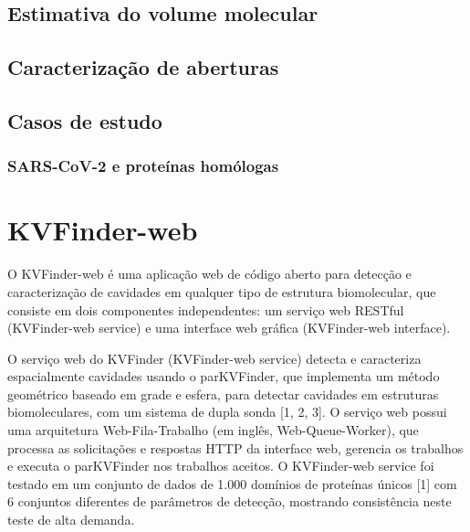 \documentclass[Portugues]{phdquali}
\begin{document}
\subsection{Estimativa do volume molecular}

\cite{guerra2023B}

\subsection{Caracterização de aberturas}

\cite{guerra2023A}

\subsection{Casos de estudo}

\subsubsection{SARS-CoV-2 e proteínas homólogas}

\section{KVFinder-web}


O KVFinder-web é uma aplicação web de código aberto para detecção e caracterização de cavidades em qualquer tipo de estrutura biomolecular, que consiste em dois componentes independentes: um serviço web RESTful (KVFinder-web service) e uma interface web gráfica (KVFinder-web interface).  

O serviço web do KVFinder (KVFinder-web service) detecta e caracteriza espacialmente cavidades usando o parKVFinder, que implementa um método geométrico baseado em grade e esfera, para detectar cavidades em estruturas biomoleculares, com um sistema de dupla sonda [1, 2, 3]. O serviço web possui uma arquitetura Web-Fila-Trabalho (em inglês, Web-Queue-Worker), que processa as solicitações e respostas HTTP da interface web, gerencia os trabalhos e executa o parKVFinder nos trabalhos aceitos. O KVFinder-web service foi testado em um conjunto de dados de 1.000 domínios de proteínas únicos [1] com 6 conjuntos diferentes de parâmetros de detecção, mostrando consistência neste teste de alta demanda. 
\end{document}
